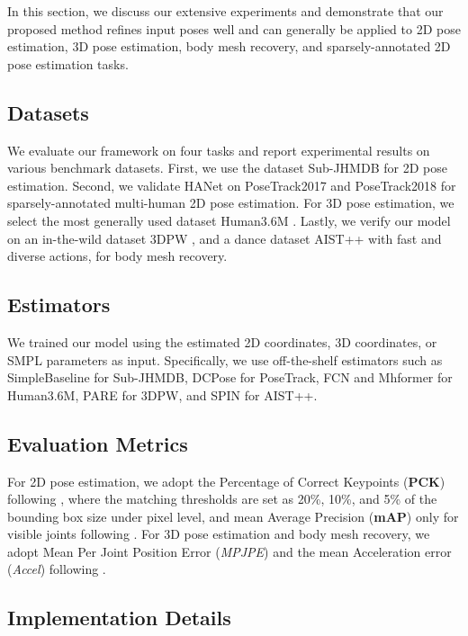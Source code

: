 \documentclass[10pt,twocolumn,letterpaper]{article}
\begin{document}
In this section, we discuss our extensive experiments and demonstrate that our proposed method refines input poses well and can generally be applied to 2D pose estimation, 3D pose estimation, body mesh recovery, and sparsely-annotated 2D pose estimation tasks.

\subsection{Datasets}

We evaluate our framework on four tasks and report experimental results on various benchmark datasets. First, we use the dataset Sub-JHMDB \cite{jhmdb} for 2D pose estimation. Second, we validate HANet on PoseTrack2017 \cite{posetrack2017} and PoseTrack2018 \cite{posetrack2018} for sparsely-annotated multi-human 2D pose estimation. For 3D pose estimation, we select the most generally used dataset Human3.6M \cite{h36m}. Lastly, we verify our model on an in-the-wild dataset 3DPW \cite{3dpw}, and a dance dataset AIST++ \cite{aist} with fast and diverse actions, for body mesh recovery. 

\subsection{Estimators}

We trained our model using the estimated 2D coordinates, 3D coordinates, or SMPL parameters as input. Specifically, we use off-the-shelf estimators such as SimpleBaseline \cite{simplebaseline} for Sub-JHMDB, DCPose \cite{dcpose} for PoseTrack, FCN \cite{fcn} and Mhformer \cite{li2022mhformer} for Human3.6M, PARE \cite{pare} for 3DPW, and SPIN \cite{spin} for AIST++.

\subsection{Evaluation Metrics}
For 2D pose estimation, we adopt the Percentage of Correct Keypoints (\textbf{PCK}) following \cite{dkd, kfp, deciwatch}, where the matching thresholds are set as 20\%, 10\%, and 5\% of the bounding box size under pixel level, and mean Average Precision (\textbf{mAP}) only for visible joints following \cite{posetrack2017,poseflow,simplebaseline,hrnet}. For 3D pose estimation and body mesh recovery, we adopt Mean Per Joint Position Error (\textit{MPJPE}) and the mean Acceleration error (\textit{Accel}) following \cite{fcn,spin,pare}.

\subsection{Implementation Details}
\end{document}
